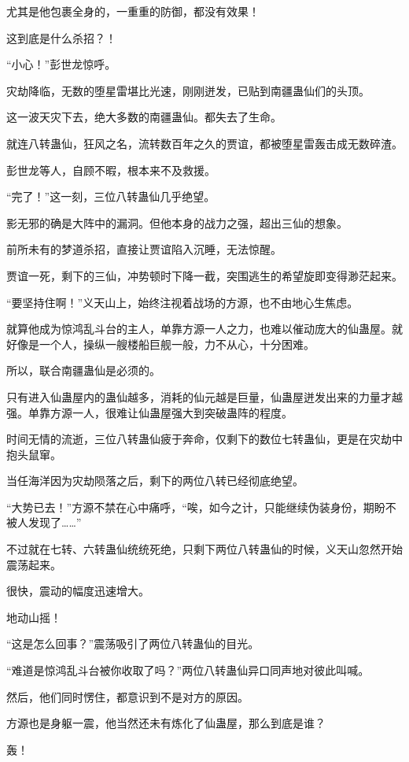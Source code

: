 \begin{this_body}
尤其是他包裹全身的，一重重的防御，都没有效果！

这到底是什么杀招？！

“小心！”彭世龙惊呼。

灾劫降临，无数的堕星雷堪比光速，刚刚迸发，已贴到南疆蛊仙们的头顶。

这一波天灾下去，绝大多数的南疆蛊仙。都失去了生命。

就连八转蛊仙，狂风之名，流转数百年之久的贾谊，都被堕星雷轰击成无数碎渣。

彭世龙等人，自顾不暇，根本来不及救援。

“完了！”这一刻，三位八转蛊仙几乎绝望。

影无邪的确是大阵中的漏洞。但他本身的战力之强，超出三仙的想象。

前所未有的梦道杀招，直接让贾谊陷入沉睡，无法惊醒。

贾谊一死，剩下的三仙，冲势顿时下降一截，突围逃生的希望旋即变得渺茫起来。

“要坚持住啊！”义天山上，始终注视着战场的方源，也不由地心生焦虑。

就算他成为惊鸿乱斗台的主人，单靠方源一人之力，也难以催动庞大的仙蛊屋。就好像是一个人，操纵一艘楼船巨舰一般，力不从心，十分困难。

所以，联合南疆蛊仙是必须的。

只有进入仙蛊屋内的蛊仙越多，消耗的仙元越是巨量，仙蛊屋迸发出来的力量才越强。单靠方源一人，很难让仙蛊屋强大到突破蛊阵的程度。

时间无情的流逝，三位八转蛊仙疲于奔命，仅剩下的数位七转蛊仙，更是在灾劫中抱头鼠窜。

当任海洋因为灾劫陨落之后，剩下的两位八转已经彻底绝望。

“大势已去！”方源不禁在心中痛呼，“唉，如今之计，只能继续伪装身份，期盼不被人发现了……”

不过就在七转、六转蛊仙统统死绝，只剩下两位八转蛊仙的时候，义天山忽然开始震荡起来。

很快，震动的幅度迅速增大。

地动山摇！

“这是怎么回事？”震荡吸引了两位八转蛊仙的目光。

“难道是惊鸿乱斗台被你收取了吗？”两位八转蛊仙异口同声地对彼此叫喊。

然后，他们同时愣住，都意识到不是对方的原因。

方源也是身躯一震，他当然还未有炼化了仙蛊屋，那么到底是谁？

轰！


\end{this_body}
